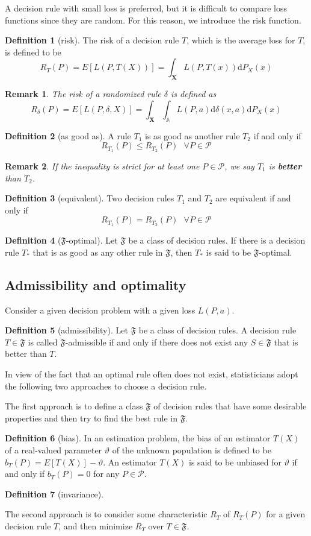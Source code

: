 \documentclass{article}
\newtheorem*{Rk}{Remark}
\theoremstyle{definition}
\newtheorem{Def}{Definition}[section]
\begin{document}
A decision rule with small loss is preferred, but it is difficult to compare loss functions since they are random. For this reason, we introduce the risk function.
\begin{Def}[risk]
The risk of a decision rule $T$, which is the average loss for $T$, is defined to be \[ R_T(P)=E[L(P,T(X))]=\int_\mathbf{X}L(P,T(x))\mathrm{d}P_X(x)\]
\end{Def}
\begin{Rk}
The risk of a randomized rule $\delta$ is defined as \[R_\delta(P)=E[L(P,\delta,X)]=\int_\mathbf{X}\int_\mathbb{A}L(P,a)\mathrm{d}\delta(x,a)\mathrm{d}P_X(x)\]
\end{Rk}
\begin{Def}[as good as]
A rule $T_1$ is as good as another rule $T_2$ if and only if \[R_{T_1}(P)\le R_{T_2}(P) \text{   } \forall P\in\mathcal{P}\]
\end{Def}
\begin{Rk}
If the inequality is strict for at least one $P\in\mathcal{P}$, we say $T_1$ is \textbf{better} than $T_2$.
\end{Rk}
\begin{Def}[equivalent]
Two decision rules $T_1$ and $T_2$ are equivalent if and only if \[R_{T_1}(P)= R_{T_2}(P) \text{   } \forall P\in\mathcal{P}\]
\end{Def}
\begin{Def}[$\mathfrak{F}$-optimal]
Let $\mathfrak{F}$ be a class of decision rules. If there is a decision rule $T_*$ that is as good as any other rule in $\mathfrak{F}$, then $T_*$ is said to be $\mathfrak{F}$-optimal.
\end{Def}
\subsection{Admissibility and optimality}
Consider a given decision problem with a given loss $L(P,a)$.
\begin{Def}[admissibility]
Let $\mathfrak{F}$ be a class of decision rules. A decision rule $T\in\mathfrak{F}$ is called $\mathfrak{F}$-admissible if and only if there does not exist any $S\in\mathfrak{F}$ that is better than $T$.
\end{Def}

In view of the fact that an optimal rule often does not exist, statisticians adopt the following two approaches to choose a decision rule.\par
The first approach is to define a class $\mathfrak{F}$ of decision rules that have some desirable properties and then try to find the best rule in $\mathfrak{F}$.
\begin{Def}[bias]
In an estimation problem, the bias of an estimator $T(X)$ of a real-valued parameter $\vartheta$ of the unknown population is defined to be $b_T(P)=E[T(X)]-\vartheta$. An estimator $T(X)$ is said to be unbiased for $\vartheta$ if and only if $b_T(P)=0$ for any $P\in\mathcal{P}$.
\end{Def}
\begin{Def}[invariance]

\end{Def}
The second approach is to consider some characteristic $R_T$ of $R_T(P)$ for a given decision rule $T$, and then minimize $R_T$ over $T\in\mathfrak{F}$.
\end{document}
